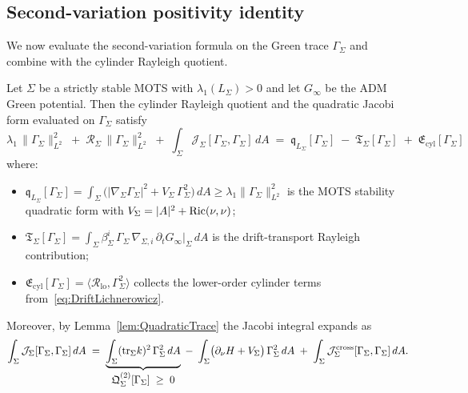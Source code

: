 \subsection{Second-variation positivity identity}

We now evaluate the second-variation formula on the Green trace $\Gamma_\Sigma$ and combine with the cylinder Rayleigh quotient.

\begin{theorem}\label{thm:SecondVariationIdentity}
Let $\Sigma$ be a strictly stable MOTS with $\lambda_1(L_\Sigma)>0$ and let $G_\infty$ be the ADM Green potential. Then the cylinder Rayleigh quotient and the quadratic Jacobi form evaluated on $\Gamma_\Sigma$ satisfy
\begin{equation}\label{eq:SecondVariationIdentity}
    \boxed{
    \lambda_1\,\|\Gamma_\Sigma\|_{L^2}^2
    \;+\;
    \mathcal R_\Sigma\,\|\Gamma_\Sigma\|_{L^2}^2
    \;+\;
    \int_\Sigma\mathcal J_\Sigma[\Gamma_\Sigma,\Gamma_\Sigma]\,dA
    \;=\;
    \mathfrak q_{L_\Sigma}[\Gamma_\Sigma]
    \;-\;\mathfrak T_\Sigma[\Gamma_\Sigma]
    \;+\;\mathfrak E_{\mathrm{cyl}}[\Gamma_\Sigma]
    }
\end{equation}
where:
\begin{itemize}
    \item $\mathfrak q_{L_\Sigma}[\Gamma_\Sigma]=\int_\Sigma\bigl(|\nabla_\Sigma\Gamma_\Sigma|^2+V_\Sigma\,\Gamma_\Sigma^2\bigr)\,dA\ge\lambda_1\|\Gamma_\Sigma\|_{L^2}^2$ is the MOTS stability quadratic form with $V_\Sigma=|A|^2+\mathrm{Ric}(\nu,\nu)$;
    \item $\mathfrak T_\Sigma[\Gamma_\Sigma]=\int_\Sigma\beta_\Sigma^i\,\Gamma_\Sigma\,\nabla_{\!\Sigma,i}\,\partial_t G_\infty|_\Sigma\,dA$ is the drift-transport Rayleigh contribution;
    \item $\mathfrak E_{\mathrm{cyl}}[\Gamma_\Sigma]=\langle\mathcal R_{\mathrm{lo}},\Gamma_\Sigma^2\rangle$ collects the lower-order cylinder terms from~\eqref{eq:DriftLichnerowicz}.
\end{itemize}
Moreover, by Lemma~\ref{lem:QuadraticTrace} the Jacobi integral expands as
\begin{equation}\label{eq:JacobiExpansion}
    \int_\Sigma\mathcal J_\Sigma[\Gamma_\Sigma,\Gamma_\Sigma]\,dA
    \;=\;
    \underbrace{\int_\Sigma(\mathrm{tr}_\Sigma k)^2\,\Gamma_\Sigma^2\,dA}_{\displaystyle\mathfrak Q_\Sigma^{(2)}[\Gamma_\Sigma]\;\ge\;0}
    \;-\;\int_\Sigma\bigl(\partial_\nu H + V_\Sigma\bigr)\,\Gamma_\Sigma^2\,dA
    \;+\;\int_\Sigma\mathcal J_\Sigma^{\mathrm{cross}}[\Gamma_\Sigma,\Gamma_\Sigma]\,dA .
\end{equation}
\end{theorem}

